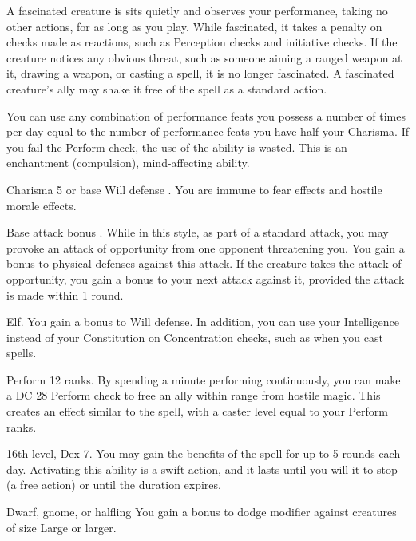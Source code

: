 A fascinated creature is sits quietly and observes your performance, taking no other actions, for as long as you play. While fascinated, it takes a  penalty on checks made as reactions, such as Perception checks and initiative checks. If the creature notices any obvious threat, such as someone aiming a ranged weapon at it, drawing a weapon, or casting a spell, it is no longer fascinated. A fascinated creature's ally may shake it free of the spell as a standard action.

You can use any combination of performance feats you possess a number of times per day equal to the number of performance feats you have \add half your Charisma. If you fail the Perform check, the use of the ability is wasted. This is an enchantment (compulsion), mind-affecting ability.

\featpre Charisma 5 or base Will defense .
\featben You are immune to fear effects and hostile morale effects.

\featpre Base attack bonus .
\featben While in this style, as part of a standard attack, you may provoke an attack of opportunity from one opponent threatening you. You gain a  bonus to physical defenses against this attack. If the creature takes the attack of opportunity, you gain a  bonus to your next attack against it, provided the attack is made within 1 round.

 Elf.
 You gain a  bonus to Will defense. In addition, you can use your Intelligence instead of your Constitution on Concentration checks, such as when you cast spells.

\featpre Perform 12 ranks.
\featben By spending a minute performing continuously, you can make a DC 28 Perform check to free an ally within \rngmed range from hostile magic. This creates an effect similar to the  spell, with a caster level equal to your Perform ranks.

\featpre 16th level, Dex 7.
\featben You may gain the benefits of the  spell for up to 5 rounds each day. Activating this ability is a swift action, and it lasts until you will it to stop (a free action) or until the duration expires.

 Dwarf, gnome, or halfling
 You gain a  bonus to dodge modifier against creatures of size Large or larger.

